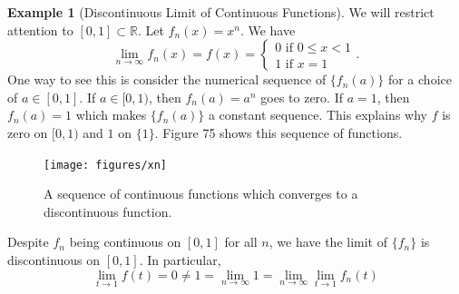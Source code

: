 \documentclass{article}
\newcommand{\R}{\mathbb{R}}
\theoremstyle{definition}
\newtheorem{example}{Example}[section]
\begin{document}
\begin{example}[Discontinuous Limit of Continuous Functions]
 We will restrict attention to $ [0,1]\subset\R $. Let $ f_n(x)=x^n $. We have $$ \lim\limits_{n\to\infty}f_n(x)=f(x)=\begin{cases}
 0\text{ if } 0\le x<1\\1\text{ if } x=1
 \end{cases} .$$ One way to see this is consider the numerical sequence of $ \{f_n(a)\} $ for a choice of $ a\in[0,1] $. If $ a\in[0,1) $, then $ f_n(a)=a^n $ goes to zero. If $ a=1 $, then $ f_n(a)=1  $ which makes $ \{f_n(a)\}  $ a constant sequence. This explains why $ f $ is zero on $ [0,1) $ and $ 1 $ on $ \{1\} $. Figure 75 shows this sequence of functions. 
 	\begin{figure}[h!]
 	\centering
 	\texttt{[image: figures/xn]}
 	\caption{A sequence of continuous functions which converges to a discontinuous function.}
 \end{figure}
 Despite $ f_n $ being continuous on $ [0,1] $ for all $ n $, we have the limit of $ \{f_n\} $ is discontinuous on $ [0,1] $. In particular, $$\lim\limits_{t\to 1}f(t)=0\neq 1=\lim\limits_{n\to \infty}1=\lim\limits_{n\to \infty}\lim\limits_{t\to 1}f_n(t) $$
\end{example} 
\end{document}

